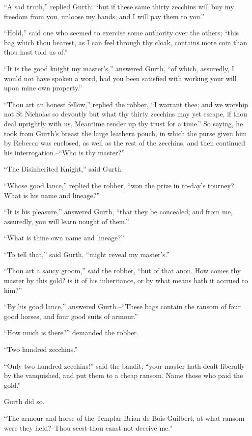 ``A sad truth,'' replied Gurth; ``but if these same thirty zecchins will
buy my freedom from you, unloose my hands, and I will pay them to you.''

``Hold,'' said one who seemed to exercise some authority over the
others; ``this bag which thou bearest, as I can feel through thy cloak,
contains more coin than thou hast told us of.''

``It is the good knight my master's,'' answered Gurth, ``of which,
assuredly, I would not have spoken a word, had you been satisfied with
working your will upon mine own property.''

``Thou art an honest fellow,'' replied the robber, ``I warrant thee; and
we worship not St Nicholas so devoutly but what thy thirty zecchins may
yet escape, if thou deal uprightly with us. Meantime render up thy trust
for a time.'' So saying, he took from Gurth's breast the large leathern
pouch, in which the purse given him by Rebecca was enclosed, as well as
the rest of the zecchins, and then continued his interrogation.--``Who
is thy master?''

``The Disinherited Knight,'' said Gurth.

``Whose good lance,'' replied the robber, ``won the prize in to-day's
tourney? What is his name and lineage?''

``It is his pleasure,'' answered Gurth, ``that they be concealed; and
from me, assuredly, you will learn nought of them.''

``What is thine own name and lineage?''

``To tell that,'' said Gurth, ``might reveal my master's.''

``Thou art a saucy groom,'' said the robber, ``but of that anon. How
comes thy master by this gold? is it of his inheritance, or by what
means hath it accrued to him?''

``By his good lance,'' answered Gurth.--``These bags contain the ransom
of four good horses, and four good suits of armour.''

``How much is there?'' demanded the robber.

``Two hundred zecchins.''

``Only two hundred zecchins!'' said the bandit; ``your master hath dealt
liberally by the vanquished, and put them to a cheap ransom. Name those
who paid the gold.''

Gurth did so.

``The armour and horse of the Templar Brian de Bois-Guilbert, at what
ransom were they held?--Thou seest thou canst not deceive me.''

